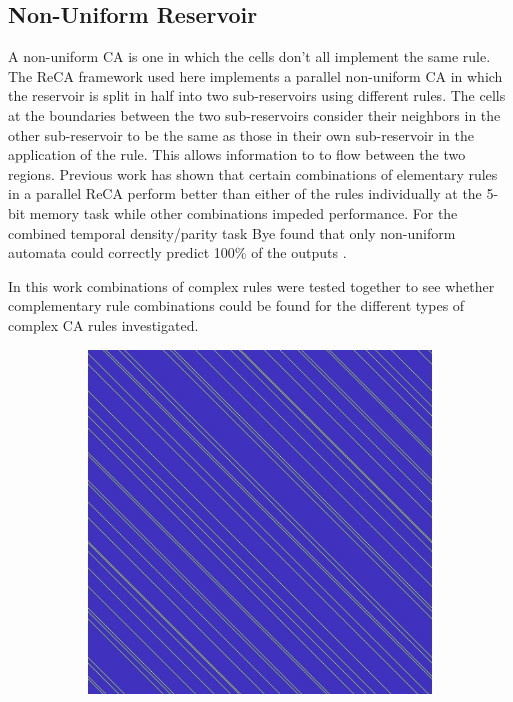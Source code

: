 \documentclass{elsarticle}
\begin{document}
\begin{multicols}{2}
\subsection{Non-Uniform Reservoir}
A non-uniform CA is one in which the cells don't all implement the same rule.  
    The ReCA framework used here implements a parallel non-uniform CA in which 
    the reservoir is split in half into two sub-reservoirs  using different 
    rules.  The cells at the boundaries between  the two sub-reservoirs 
    consider their neighbors in the other sub-reservoir to be the same as those 
    in their own sub-reservoir in the application of the rule. This allows 
    information to to flow between the two regions. Previous work has shown 
    that certain combinations of elementary rules in a parallel ReCA perform 
    better than either of the rules individually at the 5-bit memory task while 
    other combinations impeded performance\cite{nichele2017reservoir}. For the 
    combined temporal density/parity task Bye found that only non-uniform 
    automata could correctly predict 100\% of the outputs 
    \cite{bye2016investigation}.
  \par In this work combinations of complex rules were tested together to see 
  whether complementary rule combinations could be found for the different 
  types of complex CA rules investigated.     \begin{figure}[H]
\centering
\begin{subfigure}[]{0.2\linewidth}
  \includegraphics[width=\linewidth]{rule48.jpg}

\end{subfigure}
\end{figure}
\end{multicols}
\end{document}
